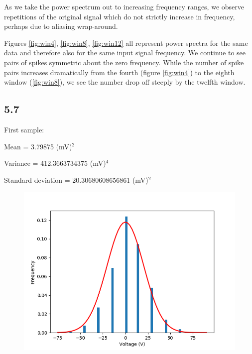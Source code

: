 \documentclass[a4paper]{article}
\begin{document}
As we take the power spectrum out to increasing frequency ranges, we observe repetitions of the original signal which do not strictly increase in frequency, perhaps due to aliasing wrap-around.

Figures \ref{fig:win4}, \ref{fig:win8}, \ref{fig:win12} all represent power spectra for the same data and therefore also for the same input signal frequency. We continue to see pairs of spikes symmetric about the zero frequency. While the number of spike pairs increases dramatically from the fourth (figure \ref{fig:win4}) to the eighth window (\ref{fig:win8}), we see the number drop off steeply by the twelfth window. %


\subsection{5.7}

First sample:

Mean = 3.79875 (mV)$^2$

Variance = 412.3663734375 (mV)$^4$

Standard deviation = 20.30680608656861 (mV)$^2$

\begin{figure}
\centering
\includegraphics[width=.45\linewidth]{5-7/histo}
\caption{}
\label{fig:histogram}
\end{figure}
\end{document}
